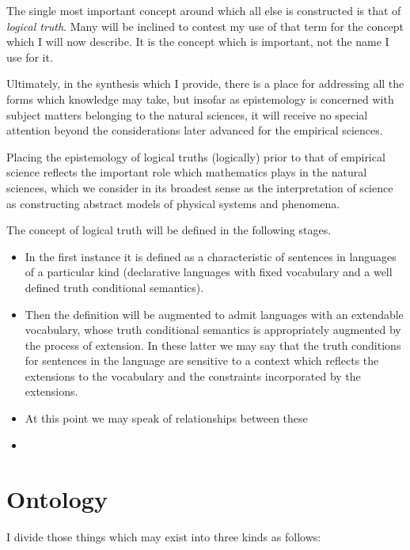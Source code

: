 \documentclass[10pt,titlepage]{book}
\begin{document}
The single most important concept around which all else is constructed is that of \emph{logical truth}.
Many will be inclined to contest my use of that term for the concept which I will now describe.
It is the concept which is important, not the name I use for it.

Ultimately, in the synthesis which I provide, there is a place for addressing all the forms which knowledge may take, but insofar as epistemology is concerned with subject matters belonging to the natural sciences, it will receive no special attention beyond the considerations later advanced for the empirical sciences.

Placing the epistemology of logical truths (logically) prior to that of empirical science reflects the important role which mathematics plays in the natural sciences, which we consider in its broadest sense as the interpretation of science as constructing abstract models of physical systems and phenomena.

The concept of logical truth will be defined in the following stages.
\begin{itemize}
  \item
    In the first instance it is defined as a characteristic of sentences in languages of a particular kind (declarative languages with fixed vocabulary and a well defined truth conditional semantics).
  \item
Then the definition will be augmented to admit languages with an extendable vocabulary, whose truth conditional semantics is appropriately augmented by the process of extension.
In these latter we may say that the truth conditions for sentences in the language are sensitive to a context which reflects the extensions to the vocabulary and the constraints incorporated by the extensions.
\item
At this point we may speak of relationships between these 
\item

\end{itemize}


\section{Ontology}

I divide those things which may exist into three kinds as follows:
\end{document}

